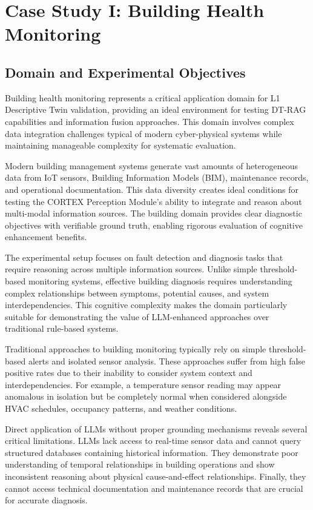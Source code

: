 
\chapter{Case Study I: Building Health Monitoring} \label{chp:building}

\section{Domain and Experimental Objectives}

Building health monitoring represents a critical application domain for L1 Descriptive Twin validation, providing an ideal environment for testing DT-RAG capabilities and information fusion approaches. This domain involves complex data integration challenges typical of modern cyber-physical systems while maintaining manageable complexity for systematic evaluation.

Modern building management systems generate vast amounts of heterogeneous data from IoT sensors, Building Information Models (BIM), maintenance records, and operational documentation. This data diversity creates ideal conditions for testing the CORTEX Perception Module's ability to integrate and reason about multi-modal information sources. The building domain provides clear diagnostic objectives with verifiable ground truth, enabling rigorous evaluation of cognitive enhancement benefits.

The experimental setup focuses on fault detection and diagnosis tasks that require reasoning across multiple information sources. Unlike simple threshold-based monitoring systems, effective building diagnosis requires understanding complex relationships between symptoms, potential causes, and system interdependencies. This cognitive complexity makes the domain particularly suitable for demonstrating the value of LLM-enhanced approaches over traditional rule-based systems.


Traditional approaches to building monitoring typically rely on simple threshold-based alerts and isolated sensor analysis. These approaches suffer from high false positive rates due to their inability to consider system context and interdependencies. For example, a temperature sensor reading may appear anomalous in isolation but be completely normal when considered alongside HVAC schedules, occupancy patterns, and weather conditions.

Direct application of LLMs without proper grounding mechanisms reveals several critical limitations. LLMs lack access to real-time sensor data and cannot query structured databases containing historical information. They demonstrate poor understanding of temporal relationships in building operations and show inconsistent reasoning about physical cause-and-effect relationships. Finally, they cannot access technical documentation and maintenance records that are crucial for accurate diagnosis.

